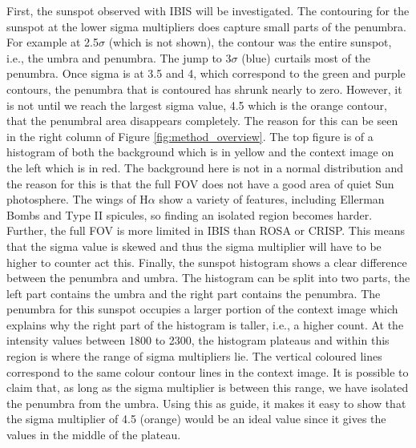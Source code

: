     First, the sunspot observed with IBIS will be investigated.
    The contouring for the sunspot at the lower sigma multipliers does capture small parts of the penumbra.
    For example at 2.5$\sigma$ (which is not shown), the contour was the entire sunspot, i.e., the umbra and penumbra.
    The jump to 3$\sigma$ (blue) curtails most of the penumbra.
    Once sigma is at 3.5 and 4, which correspond to the green and purple contours, the penumbra that is contoured has shrunk nearly to zero.
    However, it is not until we reach the largest sigma value, 4.5 which is the orange contour, that the penumbral area disappears completely.
    The reason for this can be seen in the right column of Figure \ref{fig:method_overview}.
    The top figure is of a histogram of both the background which is in yellow and the context image on the left which is in red.
    The background here is not in a normal distribution and the reason for this is that the full FOV does not have a good area of quiet Sun photosphere.
    The wings of H$\alpha$ show a variety of features, including Ellerman Bombs and Type II spicules, so finding an isolated region becomes harder.
    Further, the full FOV is more limited in IBIS than ROSA or CRISP. 
    This means that the sigma value is skewed and thus the sigma multiplier will have to be higher to counter act this.
    Finally, the sunspot histogram shows a clear difference between the penumbra and umbra.
    The histogram can be split into two parts, the left part contains the umbra and the right part contains the penumbra.
    The penumbra for this sunspot occupies a larger portion of the context image which explains why the right part of the histogram is taller, i.e., a higher count.
    At the intensity values between 1800 to 2300, the histogram plateaus and within this region is where the range of sigma multipliers lie. 
    The vertical coloured lines correspond to the same colour contour lines in the context image.
    It is possible to claim that, as long as the sigma multiplier is between this range, we have isolated the penumbra from the umbra.
    Using this as guide, it makes it easy to show that the sigma multiplier of 4.5 (orange) would be an ideal value since it gives the values in the middle of the plateau.
        
